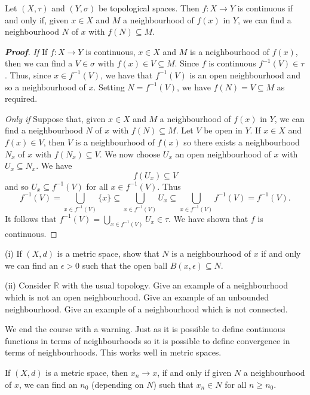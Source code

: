 \begin{lemma}\label{L;continuous via neighbourhood}
Let $(X,\tau)$ and $(Y,\sigma)$ be topological spaces.
Then $f:X\rightarrow Y$ is continuous
if and only if, given $x\in X$ and $M$
a neighbourhood of $f(x)$ in $Y$,
we can find a neighbourhood $N$ of $x$ 
with $f(N)\subseteq M$.
\end{lemma}
\begin{proof}[\bf Proof]
\noindent\emph{If} If $f:X\rightarrow Y$ is continuous,
$x\in X$ and $M$ is
a neighbourhood of $f(x)$, then we can find
a $V\in\sigma$ with $f(x)\in V\subseteq M$.
Since $f$ is continuous $f^{-1}(V)\in\tau$.
Thus, since $x\in f^{-1}(V)$, we have that $f^{-1}(V)$
is an open neighbourhood and so a neighbourhood of $x$.
Setting $N=f^{-1}(V)$, we have $f(N)=V\subseteq M$
as required.

\vspace{1\baselineskip}

\noindent\emph{Only if} Suppose that, 
given $x\in X$ and $M$
a neighbourhood of $f(x)$ in $Y$,
we can find a neighbourhood $N$ of $x$ 
with $f(N)\subseteq M$.
Let $V$ be open in $Y$. If $x\in X$
and $f(x)\in V$, then $V$ is a neighbourhood
of $f(x)$ so there exists a neighbourhood $N_{x}$
of $x$ with $f(N_{x})\subseteq V$. We now choose
$U_{x}$ an open neighbourhood of $x$ with $U_{x}\subseteq N_{x}$.
We have
\[f(U_{x})\subseteq V\]
and so $U_{x}\subseteq f^{-1}(V)$ for all $x\in f^{-1}(V)$.
Thus
\[f^{-1}(V)=\bigcup_{x\in f^{-1}(V)}\{x\}
\subseteq \bigcup_{x\in f^{-1}(V)}U_{x}
\subseteq \bigcup_{x\in f^{-1}(V)}f^{-1}(V)
=f^{-1}(V).\]
It follows that $f^{-1}(V)=\bigcup_{x\in f^{-1}(V)}U_{x}\in\tau$.
We have shown that $f$ is continuous.
\end{proof} 


\begin{exercise}\label{E;non-closed neighbourhood}
(i) If $(X,d)$ is a metric space, show that $N$
is a neighbourhood of $x$ if and only we can find an 
$\epsilon>0$ such that the open ball 
$B(x,\epsilon)\subseteq N$.

(ii) Consider ${\mathbb R}$ with the usual topology.
Give an example of a neighbourhood which is
not an open neighbourhood. Give an example  of 
an unbounded neighbourhood. Give an example  of
a neighbourhood which is not connected.
\end{exercise}

We end the course with a warning. Just as it is
possible to define continuous functions in terms
of neighbourhoods so it is possible to define convergence
in terms of neighbourhoods.
This works well in metric spaces.
\begin{lemma}\label{L;convergence, neighbourhood, metric} 
If $(X,d)$ is a metric space, then $x_{n}\rightarrow x$,
if and only if
given $N$ a neighbourhood of $x$, we can find an
$n_{0}$ (depending on $N$) such that $x_{n}\in N$
for all $n\geq n_{0}$.
\end{lemma}

